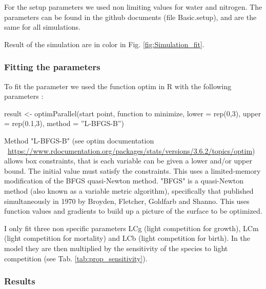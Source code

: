 \documentclass{article}
\begin{document}
For the setup parameters we used non limiting values for water and nitrogen. The parameters can be found in the github documents (file Basic.setup), and are the same for all simulations.

Result of the simulation are in color in Fig. \ref{fig:Simulation_fit}.

\subsubsection{Fitting the parameters}

To fit the parameter we used the function optim in R with the following parameters :

\begin{tcolorbox}
result <- optimParallel(start point, function to minimize, lower = rep(0,3), upper = rep(0.1,3), method = ''L-BFGS-B'')
\end{tcolorbox}

Method "L-BFGS-B" (see optim documentation ~\url{https://www.rdocumentation.org/packages/stats/versions/3.6.2/topics/optim}) allows box constraints, that is each variable can be given a lower and/or upper bound. The initial value must satisfy the constraints. This uses a limited-memory modification of the BFGS quasi-Newton method.  "BFGS" is a quasi-Newton method (also known as a variable metric algorithm), specifically that published simultaneously in 1970 by Broyden, Fletcher, Goldfarb and Shanno. This uses function values and gradients to build up a picture of the surface to be optimized.

I only fit three non specific parameters LCg (light competition for growth), LCm (light competition for mortality) and LCb (light competition for birth). In the model they are then multiplied by the sensitivity of the species to light competition (see Tab. \ref{tab:prop_sensitivity}).

\subsubsection{Results}
\end{document}
